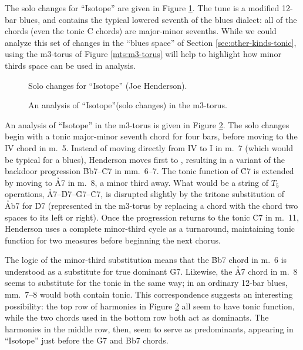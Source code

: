 The solo changes for ``Isotope'' are given in Figure
\ref{mts:isotope-solo-changes}. The tune is a modified 12-bar blues,
and contains the typical lowered seventh of the blues dialect: all of the
chords (even the tonic C chords) are major-minor sevenths. While we could
analyze this set of changes in the ``blues \tf space'' of Section
\ref{sec:other-kinds-tonic}, using the m3-torus of Figure \ref{mts:m3-torus}
will help to highlight how minor thirds space can be used in analysis.

\begin{figure}[bp]
  \caption{Solo changes for ``Isotope'' (Joe Henderson).}
  \label{mts:isotope-solo-changes}
\end{figure}

\begin{figure}[tbp]
  \caption{An analysis of ``Isotope''(solo changes) in the m3-torus.}
  \label{mts:isotope-torus}
\end{figure}

An analysis of ``Isotope'' in the m3-torus is given in Figure
\ref{mts:isotope-torus}. The solo changes begin with a tonic major-minor
seventh chord for four bars, before moving to the IV chord in m.~5. Instead of
moving directly from IV to I in m.~7 (which would be typical for a blues),
Henderson moves first to \Bflat, resulting in a variant of the backdoor
progression \h{Bb7}--\h{C7} in mm.~6--7.  The tonic function of \h{C7} is
extended by moving to \h{A7} in m.~8, a minor
third away. What would be a string of $T_5$ operations,
\h{A7}--\h{D7}--\h{G7}--\h{C7}, is disrupted slightly by the tritone
substitution of \h{Ab7} for \h{D7} (represented in the m3-torus by replacing a
chord with the chord two spaces to its left or right). Once the progression
returns to the tonic \h{C7} in m.~11, Henderson uses a complete minor-third
cycle as a turnaround, maintaining tonic function for two measures before
beginning the next chorus.


The logic of the minor-third substitution means that the \h{Bb7} chord in m.~6
is understood as a substitute for true dominant \h{G7}. Likewise, the \h{A7}
chord in m.~8 seems to substitute for the tonic in the same way; in an
ordinary 12-bar blues, mm.~7--8 would both contain tonic. This correspondence
suggests an interesting possibility: the top row of harmonies in Figure
\ref{mts:isotope-torus} all seem to have tonic function, while the two chords
used in the bottom row both act as dominants. The harmonies in the middle row,
then, seem to serve as predominants, appearing in ``Isotope'' just before the
\h{G7} and \h{Bb7} chords.

